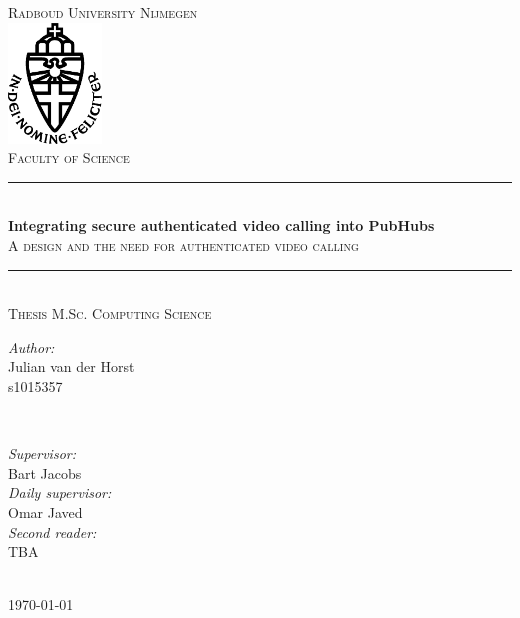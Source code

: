 \documentclass{report}
\title{\thesistitle}
\author{\thesisauthorfirst\space\thesisauthorsecond}
\date{\thesisdate}
\newcommand{\thesistitle}{Integrating secure authenticated video calling into PubHubs}
\newcommand{\thesissubtitle}{A design and the need for authenticated video calling}
\newcommand\thesisauthorfirst{Julian van der Horst \\ s1015357}
\newcommand\thesisauthorsecond{}
\newcommand\thesissupervisorfirst{Bart Jacobs}
\newcommand\thesissupervisorsecond{Omar Javed}
\newcommand\thesissecondreaderfirst{TBA}
\newcommand\thesissecondreadersecond{Bram Westerbaan}
\newcommand\thesisdate{Febrauri 2024}
\begin{document}
\begin{titlepage}
\thispagestyle{empty}
\newcommand{\HRule}{\rule{\linewidth}{0.5mm}}
\center
\textsc{\Large Radboud University Nijmegen}\\[.7cm]
\includegraphics[width=25mm]{img/in_dei_nomine_feliciter}\\[.5cm]
\textsc{Faculty of Science}\\[0.5cm]

\HRule \\[0.4cm]
{ \huge \bfseries \thesistitle}\\[0.1cm]
\textsc{\thesissubtitle}\\
\HRule \\[.5cm]
\textsc{\large Thesis M.Sc. Computing Science}\\[.5cm]

\begin{minipage}{0.4\textwidth}
    \begin{flushleft}
        \large
        \emph{Author:}\\
        \thesisauthorfirst\space \textsc{\thesisauthorsecond}
    \end{flushleft}
\end{minipage}
~
\begin{minipage}{0.4\textwidth}
    \begin{flushright}
        \large
        \emph{Supervisor:} \\
        \thesissupervisorfirst  \\[1em]
        \emph{Daily supervisor:} \\
        \thesissupervisorsecond \\[1em]
        \emph{Second reader:} \\
        \thesissecondreaderfirst\\
    \end{flushright}
\end{minipage}\\[4cm]
\vfill
{\large \today}
\end{titlepage}

\tableofcontents
\end{document}

